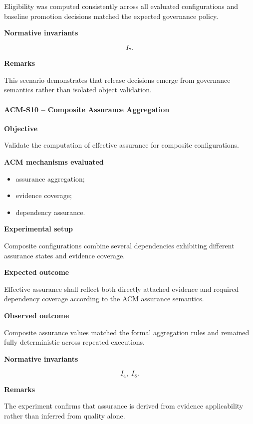 \documentclass[10pt]{article}
\begin{document}
Eligibility was computed consistently across all evaluated configurations and
baseline promotion decisions matched the expected governance policy.

\textbf{Normative invariants}

\[
I_7.
\]

\textbf{Remarks}

This scenario demonstrates that release decisions emerge from governance
semantics rather than isolated object validation.

\paragraph{ACM-S10 -- Composite Assurance Aggregation}

\textbf{Objective}

Validate the computation of effective assurance for composite configurations.

\textbf{ACM mechanisms evaluated}

\begin{itemize}
    \item assurance aggregation;
    \item evidence coverage;
    \item dependency assurance.
\end{itemize}

\textbf{Experimental setup}

Composite configurations combine several dependencies exhibiting different
assurance states and evidence coverage.

\textbf{Expected outcome}

Effective assurance shall reflect both directly attached evidence and required
dependency coverage according to the ACM assurance semantics.

\textbf{Observed outcome}

Composite assurance values matched the formal aggregation rules and remained
fully deterministic across repeated executions.

\textbf{Normative invariants}

\[
I_4,\;
I_8.
\]

\textbf{Remarks}

The experiment confirms that assurance is derived from evidence applicability
rather than inferred from quality alone.

\end{document}
